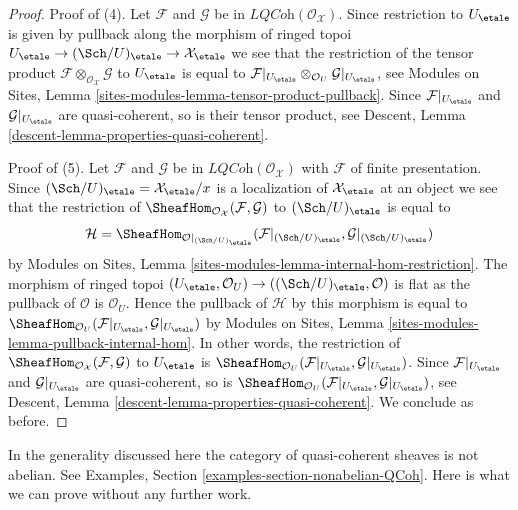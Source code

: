 \begin{proof}
\medskip\noindent
Proof of (4). Let $\mathcal{F}$ and $\mathcal{G}$ be in
$\textit{LQCoh}(\mathcal{O}_\mathcal{X})$. Since restriction to $U_\etale$
is given by pullback along the morphism of ringed topoi
$U_\etale \to (\Sch/U)_\etale \to \mathcal{X}_\etale$
we see that the restriction of the tensor product
$\mathcal{F} \otimes_{\mathcal{O}_\mathcal{X}} \mathcal{G}$
to $U_\etale$ is equal to
$\mathcal{F}|_{U_\etale} \otimes_{\mathcal{O}_U} \mathcal{G}|_{U_\etale}$,
see Modules on Sites, Lemma \ref{sites-modules-lemma-tensor-product-pullback}.
Since $\mathcal{F}|_{U_\etale}$ and $\mathcal{G}|_{U_\etale}$
are quasi-coherent, so is their tensor product, see
Descent, Lemma \ref{descent-lemma-properties-quasi-coherent}.

\medskip\noindent
Proof of (5). Let $\mathcal{F}$ and $\mathcal{G}$ be in
$\textit{LQCoh}(\mathcal{O}_\mathcal{X})$ with $\mathcal{F}$
of finite presentation. Since
$(\Sch/U)_\etale = \mathcal{X}_\etale/x$
is a localization of $\mathcal{X}_\etale$ at an object
we see that the restriction of
$\SheafHom_{\mathcal{O}_\mathcal{X}}(\mathcal{F}, \mathcal{G})$
to $(\Sch/U)_\etale$ is equal to
$$
\mathcal{H} =
\SheafHom_{\mathcal{O}|_{(\Sch/U)_\etale}}(
\mathcal{F}|_{(\Sch/U)_\etale}, \mathcal{G}|_{(\Sch/U)_\etale})
$$
by Modules on Sites, Lemma \ref{sites-modules-lemma-internal-hom-restriction}.
The morphism of ringed topoi
$(U_\etale, \mathcal{O}_U) \to ((\Sch/U)_\etale, \mathcal{O})$
is flat as the pullback of $\mathcal{O}$ is $\mathcal{O}_U$.
Hence the pullback of $\mathcal{H}$ by this morphism is equal to
$\SheafHom_{\mathcal{O}_U}(\mathcal{F}|_{U_\etale}, \mathcal{G}|_{U_\etale})$
by Modules on Sites, Lemma \ref{sites-modules-lemma-pullback-internal-hom}.
In other words, the restriction of
$\SheafHom_{\mathcal{O}_\mathcal{X}}(\mathcal{F}, \mathcal{G})$
to $U_\etale$ is
$\SheafHom_{\mathcal{O}_U}(\mathcal{F}|_{U_\etale}, \mathcal{G}|_{U_\etale})$.
Since $\mathcal{F}|_{U_\etale}$ and $\mathcal{G}|_{U_\etale}$
are quasi-coherent, so is
$\SheafHom_{\mathcal{O}_U}(\mathcal{F}|_{U_\etale}, \mathcal{G}|_{U_\etale})$,
see Descent, Lemma \ref{descent-lemma-properties-quasi-coherent}.
We conclude as before.
\end{proof}

In the generality discussed here the category of quasi-coherent sheaves
is not abelian. See Examples, Section \ref{examples-section-nonabelian-QCoh}.
Here is what we can prove without any further work.

